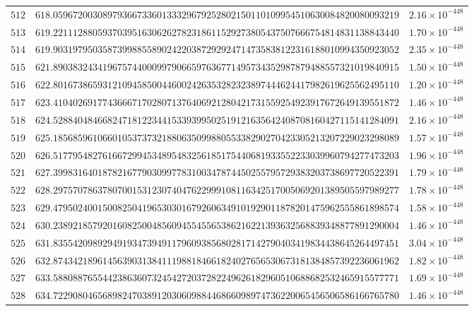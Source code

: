 \documentclass[12pt,reqno]{amsart}
\theoremstyle{remark}
\begin{document}
\begin{longtable}{clc}
$512$ & $618.0596720030897936673360133329679252802150110109954510630084820080093219$ & $2.16\times 10^{-448}$ \\
$513$ & $619.2211128805937039516306262782318611529273805437507666754814831138843440$ & $1.70\times 10^{-448}$ \\
$514$ & $619.9031979503587399885589024220387292924714735838122316188010994350923052$ & $2.35\times 10^{-448}$ \\
$515$ & $621.8903832434196757440009979066597636771495734352987879488557321019840915$ & $1.50\times 10^{-448}$ \\
$516$ & $622.8016738659312109458500446002426353282323897444624417982619625562495110$ & $1.20\times 10^{-448}$ \\
$517$ & $623.4104026917743666717028071376406921280421731559254923917672649139551872$ & $1.46\times 10^{-448}$ \\
$518$ & $624.5288404846682471812234415339399502519121635642408708160427115141284091$ & $2.16\times 10^{-448}$ \\
$519$ & $625.1856859610660105373732188063509988055338290270423305213207229023298089$ & $1.57\times 10^{-448}$ \\
$520$ & $626.5177954827616672994534895483256185175440681933552233039960794277473203$ & $1.96\times 10^{-448}$ \\
$521$ & $627.3998316401878216779030997783100347874450255795729383203738697720522391$ & $1.79\times 10^{-448}$ \\
$522$ & $628.2975707863780700153123074047622999108116342517005069201389505597989277$ & $1.78\times 10^{-448}$ \\
$523$ & $629.4795024001500825041965303016792606349101929011878201475962555861898574$ & $1.58\times 10^{-448}$ \\
$524$ & $630.2389218579201608250048560945545565386216221393632568839348877891290004$ & $1.46\times 10^{-448}$ \\
$525$ & $631.8355420989294919347394911796093856802817142790403419834438645264497451$ & $3.04\times 10^{-448}$ \\
$526$ & $632.8743421896145639031384111988184661824027656530673181384857392236061962$ & $1.82\times 10^{-448}$ \\
$527$ & $633.5880887655442386360732454272037282249626182960510688682532465915577771$ & $1.69\times 10^{-448}$ \\
$528$ & $634.7229080465689824703891203060988446866098974736220065456506586166765780$ & $1.46\times 10^{-448}$ \\

\end{longtable}
\end{document}
